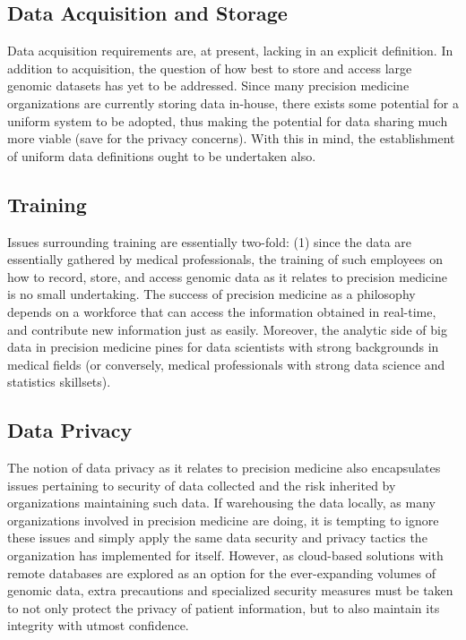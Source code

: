 \subsection{Data Acquisition and Storage}
Data acquisition requirements are, at present, lacking in an explicit definition\cite{ehealth2017}. In addition to acquisition, the question of how best to store and access large genomic datasets has yet to be addressed. Since many precision medicine organizations are currently storing data in-house, there exists some potential for a uniform system to be adopted, thus making the potential for data sharing much more viable (save for the privacy concerns). With this in mind, the establishment of uniform data definitions ought to be undertaken also.

\subsection{Training}
Issues surrounding training are essentially two-fold: (1) since the data are essentially gathered by medical professionals, the training of such employees on how to record, store, and access genomic data as it relates to precision medicine is no small undertaking. The success of precision medicine as a philosophy depends on a workforce that can access the information obtained in real-time, and contribute new information just as easily. Moreover, the analytic side of big data in precision medicine pines for data scientists with strong backgrounds in medical fields (or conversely, medical professionals with strong data science and statistics skillsets)\cite{He2017}.

\subsection{Data Privacy}
The notion of data privacy as it relates to precision medicine also encapsulates issues pertaining to security of data collected and the risk inherited by organizations maintaining such data. If warehousing the data locally, as many organizations involved in precision medicine are doing, it is tempting to ignore these issues and simply apply the same data security and privacy tactics the organization has implemented for itself\cite{ehealth2017}\cite{He2017}. However, as cloud-based solutions with remote databases are explored as an option for the ever-expanding volumes of genomic data, extra precautions and specialized security measures must be taken to not only protect the privacy of patient information, but to also maintain its integrity with utmost confidence.

